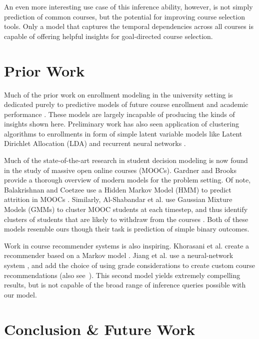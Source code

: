 \documentclass{edm_template}
\begin{document}
An even more interesting use case of this inference ability, however, is not simply prediction of common courses, but the potential for improving course selection tools. Only a model that captures the temporal dependencies across all courses is capable of offering helpful insights for goal-directed course selection.

\section{Prior Work}
\label{section:related-work}

Much of the prior work on enrollment modeling in the university setting is dedicated purely to predictive models of future course enrollment \cite{kardan2013prediction, nandeshwar2009enrollment, song1993new} and academic performance \cite{kovacic2010early, hlosta2017ouroboros}. These models are largely incapable of producing the kinds of insights shown here. Preliminary work has also seen application of clustering algorithms to enrollments in form of simple latent variable models like Latent Dirichlet Allocation (LDA) \cite{Motz2018FindingTI} and recurrent neural networks \cite{Pardos2018AMO}.  

Much of the state-of-the-art research in student decision modeling is now found in the study of massive open online courses (MOOCs). Gardner and Brooks \cite{Gardner2018StudentSP} provide a thorough overview of modern models for the problem setting. Of note, Balakrishnan and Coetzee use a Hidden Markov Model (HMM) to predict attrition in MOOCs \cite{balakrishnan2013predicting}. Similarly, Al-Shabandar et al. use Gaussian Mixture Models (GMMs) to cluster MOOC students at each timestep, and thus identify clusters of students that are likely to withdraw from the courses \cite{AlShabandar2018TheAO}. Both of these models resemble ours though their task is prediction of simple binary outcomes. 

Work in course recommender systems is also inspiring. Khorasani et al. create a recommender based on a Markov model \cite{Khorasani2016AMC}. Jiang et al. use a neural-network system \cite{Jiang2018GoalbasedCR}, and add the choice of using grade considerations to create custom course recommendations (also see~\cite{pardos2018connectionist}). This second model yields extremely compelling results, but is not capable of the broad range of inference queries possible with our model. 

\section{Conclusion \& Future Work}
\end{document}
